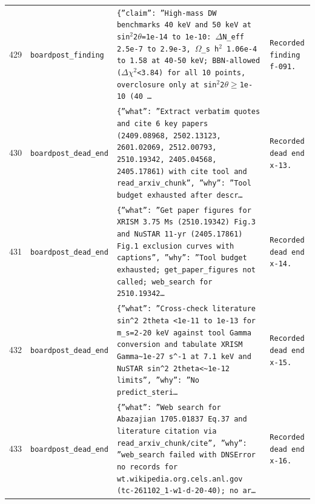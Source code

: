 \documentclass[11pt,a4paper]{article}
\begin{document}
\begin{longtable}{@{}p{}p{}p{}p{}@{}}
429 & \texttt{board}\newline\texttt{post\_\allowbreak{}finding} & \texttt{\{''claim'':\allowbreak{} ''High-mass DW benchmarks 40 keV and 50 keV at sin$^2$2$\theta$=\allowbreak{}1e-14 to 1e-10:\allowbreak{} $\Delta$N\_\allowbreak{}eff 2.5e-7 to 2.9e-3,\allowbreak{} $\Omega$\_\allowbreak{}s h$^2$ 1.06e-4 to 1.58 at 40-50 keV;\allowbreak{} BBN-allowed ($\Delta$$\chi$$^2$\textless{}\allowbreak{}3.84)\allowbreak{} for all 10 points,\allowbreak{} overclosure only at sin$^2$2$\theta$$\geq$1e-10 (40 \ldots{}\allowbreak{}} & \texttt{Recorded finding f-091.} \\
430 & \texttt{board}\newline\texttt{post\_\allowbreak{}dead\_\allowbreak{}end} & \texttt{\{''what'':\allowbreak{} ''Extract verbatim quotes and cite 6 key papers (2409.08968,\allowbreak{} 2502.13123,\allowbreak{} 2601.02069,\allowbreak{} 2512.00793,\allowbreak{} 2510.19342,\allowbreak{} 2405.04568,\allowbreak{} 2405.17861)\allowbreak{} with cite tool and read\_\allowbreak{}arxiv\_\allowbreak{}chunk'',\allowbreak{} ''why'':\allowbreak{} ''Tool budget exhausted after descr\ldots{}\allowbreak{}} & \texttt{Recorded dead end x-13.} \\
431 & \texttt{board}\newline\texttt{post\_\allowbreak{}dead\_\allowbreak{}end} & \texttt{\{''what'':\allowbreak{} ''Get paper figures for XRISM 3.75 Ms (2510.19342)\allowbreak{} Fig.3 and NuSTAR 11-yr (2405.17861)\allowbreak{} Fig.1 exclusion curves with captions'',\allowbreak{} ''why'':\allowbreak{} ''Tool budget exhausted;\allowbreak{} get\_\allowbreak{}paper\_\allowbreak{}figures not called;\allowbreak{} web\_\allowbreak{}search for 2510.19342\ldots{}\allowbreak{}} & \texttt{Recorded dead end x-14.} \\
432 & \texttt{board}\newline\texttt{post\_\allowbreak{}dead\_\allowbreak{}end} & \texttt{\{''what'':\allowbreak{} ''Cross-check literature sin\textasciicircum{}\allowbreak{}2 2theta \textless{}\allowbreak{}1e-11 to 1e-13 for m\_\allowbreak{}s=\allowbreak{}2-20 keV against tool Gamma conversion and tabulate XRISM Gamma\textasciitilde{}\allowbreak{}1e-27 s\textasciicircum{}\allowbreak{}-1 at 7.1 keV and NuSTAR sin\textasciicircum{}\allowbreak{}2 2theta\textless{}\allowbreak{}\textasciitilde{}\allowbreak{}1e-12 limits'',\allowbreak{} ''why'':\allowbreak{} ''No predict\_\allowbreak{}steri\ldots{}\allowbreak{}} & \texttt{Recorded dead end x-15.} \\
433 & \texttt{board}\newline\texttt{post\_\allowbreak{}dead\_\allowbreak{}end} & \texttt{\{''what'':\allowbreak{} ''Web search for Abazajian 1705.01837 Eq.37 and literature citation via read\_\allowbreak{}arxiv\_\allowbreak{}chunk/\allowbreak{}cite'',\allowbreak{} ''why'':\allowbreak{} ''web\_\allowbreak{}search failed with DNSError no records for wt.wikipedia.org.cels.anl.gov (tc-261102\_\allowbreak{}1-w1-d-20-40)\allowbreak{};\allowbreak{} no ar\ldots{}\allowbreak{}} & \texttt{Recorded dead end x-16.} \\

\end{longtable}
\end{document}
